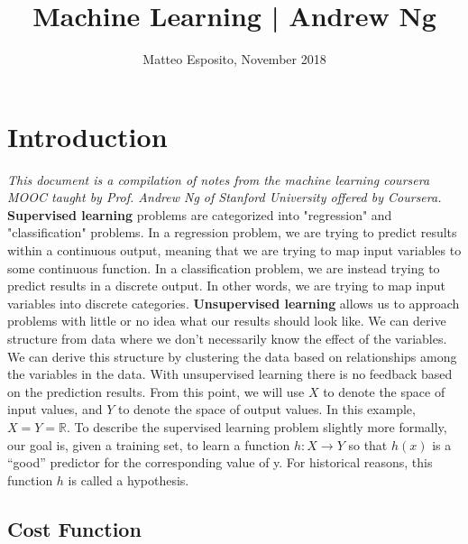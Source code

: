 \documentclass{article}
\title{Machine Learning | Andrew Ng}
\author{Matteo Esposito, November 2018}
\begin{document}
    \maketitle
    \newpage

    \section{Introduction}

        \textit{This document is a compilation of notes from the machine learning coursera MOOC taught by Prof. Andrew Ng of Stanford University
        offered by Coursera.}
        \medskip
        \textbf{Supervised learning} problems are categorized into "regression" and "classification" problems. In a regression problem, 
        we are trying to predict results within a continuous output, meaning that we are trying to map input variables to some 
        continuous function. In a classification problem, we are instead trying to predict results in a discrete output. In other words, 
        we are trying to map input variables into discrete categories.
        \medskip
        \textbf{Unsupervised learning} allows us to approach problems with little or no idea what our results should look like. 
        We can derive structure from data where we don't necessarily know the effect of the variables.
        We can derive this structure by clustering the data based on relationships among the variables in the data.
        With unsupervised learning there is no feedback based on the prediction results.
        \medskip
        From this point, we will use $X$ to denote the space of input values, and $Y$ to denote the space of output values. In this example, $X = Y = \mathbb{R}$.
        \medskip
        To describe the supervised learning problem slightly more formally, our goal is, given a training set, 
        to learn a function $h : X \longrightarrow Y$ so that $h(x)$ is a “good” predictor for the corresponding value of y. For historical reasons, this 
        function $h$ is called a hypothesis. 
        
        \subsection{Cost Function}
            
\end{document}
